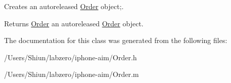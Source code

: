 Creates an autoreleased \hyperlink{interface_order}{Order} object;. 

\begin{DoxyReturn}{Returns}
\hyperlink{interface_order}{Order} an autoreleased \hyperlink{interface_order}{Order} object. 
\end{DoxyReturn}


The documentation for this class was generated from the following files:\begin{DoxyCompactItemize}
\item 
/Users/Shiun/labzero/iphone-\/aim/Order.h\item 
/Users/Shiun/labzero/iphone-\/aim/Order.m\end{DoxyCompactItemize}
